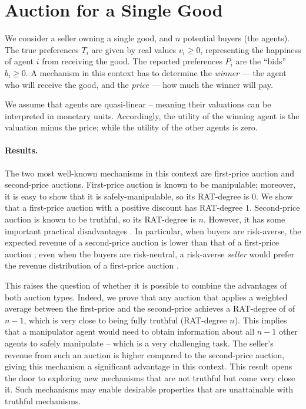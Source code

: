 \section{Auction for a Single Good}
\label{sec:single-item-auction}

We consider a seller owning a single good, and $n$ potential buyers (the agents). 
The true preferences $T_i$ are given by real values $v_i \geq 0$, representing the happiness of agent $i$ from receiving the good. 
The reported preferences $P_i$ are the ``bids'' $b_i \geq 0 $.
A mechanism in this context has to determine the \emph{winner} --- the agent who will receive the good, and the \emph{price} --- how much the winner will pay.

We assume that agents are quasi-linear -- meaning their valuations can be interpreted in monetary units. 
Accordingly, the utility of the winning agent is the valuation minus the price; while the utility of the other agents is zero. 

\paragraph{Results.} The two most well-known mechanisms in this context are first-price auction and second-price auctions. 
%
First-price auction is known to be manipulable; moreover, it is easy to show that it is safely-manipulable, so its RAT-degree is $0$.
We show that a first-price auction with a positive discount has RAT-degree $1$.
%
Second-price auction is known to be truthful, so its  RAT-degree is $n$.
However, it has some important practical disadvantages \cite{ausubel2006lovely}. In particular, when buyers are risk-averse, the expected revenue of a second-price auction is lower than that of a first-price auction \cite{nisan2007algorithmic};
even when the buyers are risk-neutral, a risk-averse \emph{seller} would prefer the revenue distribution of a first-price auction \citep{krishna2009auction}.%

This raises the question of whether it is possible to combine the advantages of both auction types.
Indeed, we prove that 
any auction that applies a weighted average between the first-price and the second-price achieves a RAT-degree of of $n-1$, which is very close to being fully truthful (RAT-degree $n$). 
This implies that a manipulator agent would need to obtain information about all $n-1$ other agents to safely manipulate -- which is a very challenging task.
The seller’s revenue from such an auction is higher compared to the second-price auction, giving this mechanism a significant advantage in this context. 
This result opens the door to exploring new mechanisms that are not truthful but come very close it. 
Such mechanisms may enable desirable properties that  are unattainable with truthful mechanisms.


